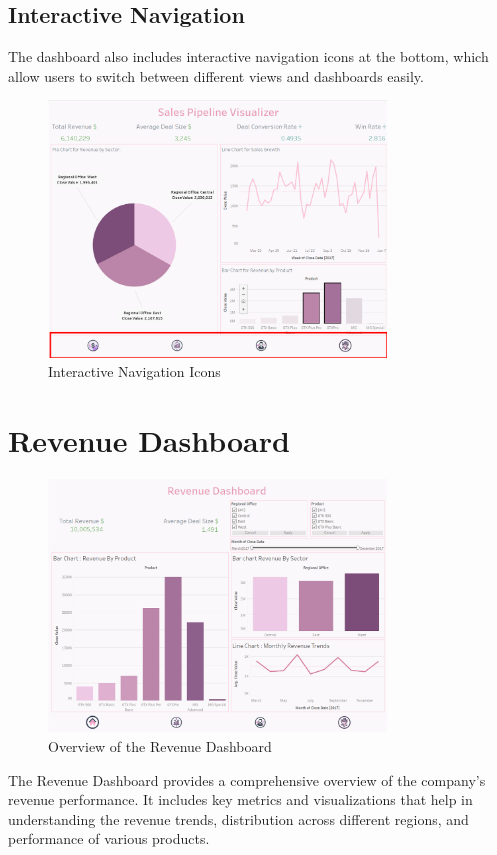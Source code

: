 \documentclass{article}
\begin{document}
\subsection{Interactive Navigation}
The dashboard also includes interactive navigation icons at the bottom, which allow users to switch between different views and dashboards easily.

\begin{figure}[h!]
    \centering
    \includegraphics[width=0.8\textwidth]{resources/swappy-20240527_141526.png}
    \caption{Interactive Navigation Icons}
    \label{fig:navigation_icons}
\end{figure}

\clearpage

\section{Revenue Dashboard}
\begin{figure}[h!]
    \centering
    \includegraphics[width=0.8\textwidth]{resources/swappy-20240527_152429.png}
    \caption{Overview of the Revenue Dashboard}
    \label{fig:revenue_dashboard_overview}
\end{figure}
The Revenue Dashboard provides a comprehensive overview of the company's revenue performance. It includes key metrics and visualizations that help in understanding the revenue trends, distribution across different regions, and performance of various products.
\end{document}
